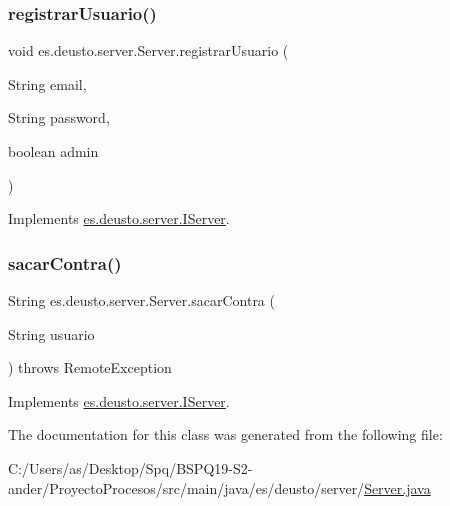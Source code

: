 \mbox{\label{classes_1_1deusto_1_1server_1_1_server_a0f79b8db6904facdae94410e26bef452}} 
\subsubsection{\texorpdfstring{registrarUsuario()}{registrarUsuario()}}
{\footnotesize\ttfamily void es.\+deusto.\+server.\+Server.\+registrar\+Usuario (\begin{DoxyParamCaption}\item[{String}]{email,  }\item[{String}]{password,  }\item[{boolean}]{admin }\end{DoxyParamCaption})}



Implements \mbox{\hyperlink{interfacees_1_1deusto_1_1server_1_1_i_server_af6743c655c7831fa6d87e6e910bb6db4}{es.\+deusto.\+server.\+I\+Server}}.

\mbox{\label{classes_1_1deusto_1_1server_1_1_server_aefe051d880626950ea2964d89a4ae3c3}} 
\subsubsection{\texorpdfstring{sacarContra()}{sacarContra()}}
{\footnotesize\ttfamily String es.\+deusto.\+server.\+Server.\+sacar\+Contra (\begin{DoxyParamCaption}\item[{String}]{usuario }\end{DoxyParamCaption}) throws Remote\+Exception}



Implements \mbox{\hyperlink{interfacees_1_1deusto_1_1server_1_1_i_server_a950b819a4f67edf0ef76221dd4714d47}{es.\+deusto.\+server.\+I\+Server}}.



The documentation for this class was generated from the following file\+:\begin{DoxyCompactItemize}
\item 
C\+:/\+Users/as/\+Desktop/\+Spq/\+B\+S\+P\+Q19-\/\+S2-\/ander/\+Proyecto\+Procesos/src/main/java/es/deusto/server/\mbox{\hyperlink{_server_8java}{Server.\+java}}\end{DoxyCompactItemize}
